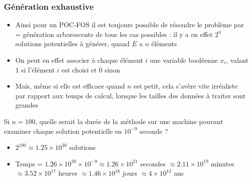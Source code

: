 \documentclass[aspectratio=1610,francais,envcountsect]{beamer}
\begin{document}
\begin{frame}
  \frametitle{Génération exhaustive}
  \begin{itemize}
  \item Ainsi pour un POC-FOS il est toujours possible de résoudre le
    problème par  = génération
    arborescente de tous les cas possibles : il y a en effet $2^n$
    solutions potentielles à générer, quand $E$ a $n$ éléments
  
  
  \item On peut en effet associer à chaque élément $i$ une variable
    booléenne $x_i$, valant $1$ si l'élément $i$ est choisi et $0$
    sinon

  
  
  \item Mais, même si elle est efficace quand $n$ est petit, cela
    s'avère vite irréaliste par rapport aux temps de calcul, lorsque
    les tailles des données à traiter sont grandes
  \end{itemize}
  \begin{example}
    Si $n = 100$, quelle serait la durée de la méthode sur une machine
    pouvant examiner chaque solution potentielle en $10^{-9}$ seconde
    ?

    \pause

    \begin{itemize}
    \item $2^{100} \approx 1.25 \times 10^{30}$ solutions
    \item Temps =
      $1.26 \times 10^{30} \times 10^{-9} \approx 1.26 \times 10^{21}$
      secondes $\approx 2.11\times10^{19}$ minutes
      $\approx 3.52\times10^{17}$ heures $\approx 1.46\times10^{16}$
      jours $\approx 4 \times 10^{13}$ ans
    \end{itemize}

  \end{example}

\end{frame}
\end{document}
